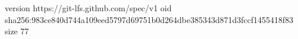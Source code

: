 version https://git-lfs.github.com/spec/v1
oid sha256:983ce840d744a109eed5797d69751b0d264dbe385343d871d3fccf1455418f83
size 77
